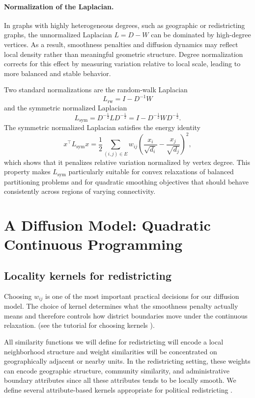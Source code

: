 \documentclass[11pt]{article}
\begin{document}
\paragraph{Normalization of the Laplacian.}
In graphs with highly heterogeneous degrees, such as geographic or redistricting graphs, the unnormalized Laplacian $L=D-W$ can be dominated by high-degree vertices. As a result, smoothness penalties and diffusion dynamics may reflect local density rather than meaningful geometric structure. Degree normalization corrects for this effect by measuring variation relative to local scale, leading to more balanced and stable behavior.

Two standard normalizations are the random-walk Laplacian
\[
L_{\mathrm{rw}} = I - D^{-1}W
\]
and the symmetric normalized Laplacian
\[
L_{\mathrm{sym}} = D^{-\frac{1}{2}} L D^{-\frac{1}{2}} 
= I - D^{-\frac{1}{2}} W D^{-\frac{1}{2}}.
\]
The symmetric normalized Laplacian satisfies the energy identity
\[
x^\top L_{\mathrm{sym}} x
= \frac{1}{2} \sum_{(i,j)\in E} w_{ij}
\left(\frac{x_i}{\sqrt{d_i}} - \frac{x_j}{\sqrt{d_j}}\right)^2,
\]
which shows that it penalizes relative variation normalized by vertex degree. This property makes $L_{\mathrm{sym}}$ particularly suitable for convex relaxations of balanced partitioning problems and for quadratic smoothing objectives that should behave consistently across regions of varying connectivity.


\section{A Diffusion Model: Quadratic Continuous Programming}\label{sec:diffusion}
 

\subsection{Locality kernels for redistricting}\label{sec:kernel}

Choosing $w_{ij}$ is one of the most important practical decisions for our diffusion model. The choice of kernel determines what the smoothness penalty actually means and therefore controls how district boundaries move under the continuous relaxation. (see the tutorial for choosing kernels \cite{von2007tutorial}).   

All similarity functions we will define for redistricting will encode a local neighborhood structure and weight similarities will be concentrated on geographically adjacent or nearby units. In the redistricting setting, these weights can encode geographic structure, community similarity, and administrative boundary attributes since all these attributes tends to be locally smooth. We define several attribute-based kernels appropriate for political redistricting \cite{duchin2021political}.
\end{document}
